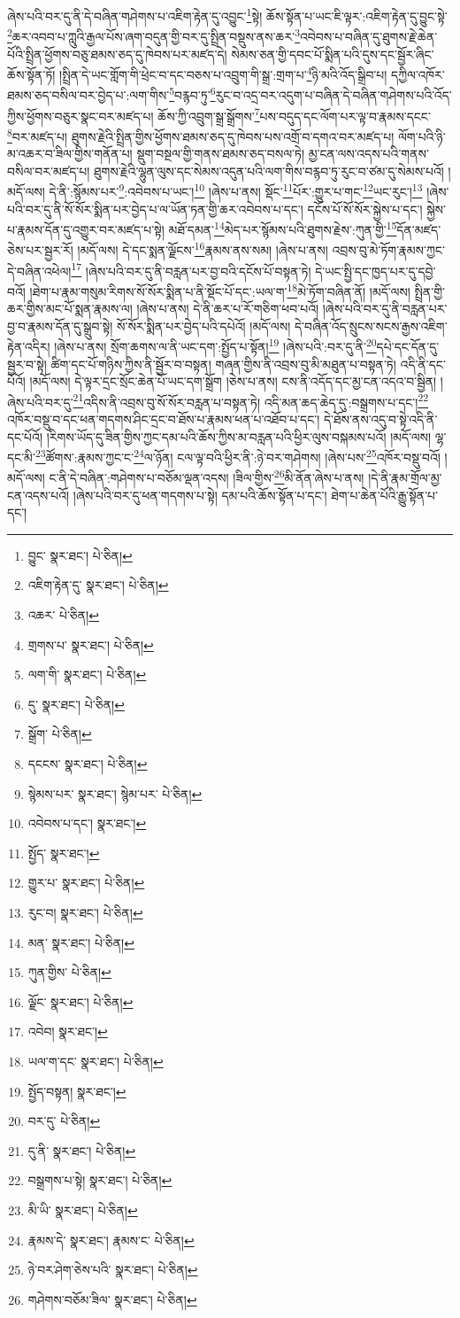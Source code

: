 ཞེས་པའི་བར་དུ་ནི་དེ་བཞིན་གཤེགས་པ་འཇིག་རྟེན་དུ་འབྱུང་\footnote{བྱུང་  སྣར་ཐང་།  པེ་ཅིན། }སྟེ། ཆོས་སྟོན་པ་ཡང་ཇི་ལྟར་:འཇིག་རྟེན་དུ་བྱུང་སྟེ་\footnote{འཇིག་རྟེན་དུ་  སྣར་ཐང་།  པེ་ཅིན། }ཆར་འབབ་པ་ཀླུའི་རྒྱལ་པོས་ཞག་བདུན་གྱི་བར་དུ་སྤྲིན་བསྡུས་ནས་ཆར་\footnote{འཆར་  པེ་ཅིན། }འབེབས་པ་བཞིན་དུ་ཐུགས་རྗེ་ཆེན་པོའི་སྤྲིན་ཕྱོགས་བཅུ་ཐམས་ཅད་དུ་ཁེབས་པར་མཛད་དེ། སེམས་ཅན་གྱི་དབང་པོ་སྨིན་པའི་དུས་དང་སྦྱོར་ཞིང་ཆོས་སྟོན་ཏོ། །སྤྲིན་དེ་ཡང་གློག་གི་ཕྲེང་བ་དང་བཅས་པ་འབྲུག་གི་སྒྲ་:གྲག་པ་\footnote{གྲགས་པ་  སྣར་ཐང་།  པེ་ཅིན། }ཉི་མའི་འོད་སྒྲིབ་པ། དཀྱིལ་འཁོར་ཐམས་ཅད་བསིལ་བར་བྱེད་པ་:ལག་གིས་\footnote{ལག་གི་  སྣར་ཐང་།  པེ་ཅིན། }བརྙབ་ཏུ་\footnote{དུ་  སྣར་ཐང་།  པེ་ཅིན། }རུང་བ་འདྲ་བར་འདུག་པ་བཞིན་དེ་བཞིན་གཤེགས་པའི་འོད་ཀྱིས་ཕྱོགས་བཅུར་སྣང་བར་མཛད་པ། ཆོས་ཀྱི་འབྲུག་སྒྲ་སྒྲོགས་\footnote{སྒྲོག་  པེ་ཅིན། }པས་བདུད་དང་ལོག་པར་ལྟ་བ་རྣམས་དངང་\footnote{དངངས་  སྣར་ཐང་།  པེ་ཅིན། }བར་མཛད་པ། ཐུགས་རྗེའི་སྤྲིན་གྱིས་ཕྱོགས་ཐམས་ཅད་དུ་ཁེབས་པས་འགྲོ་བ་དགའ་བར་མཛད་པ། ལོག་པའི་ཉི་མ་འཆར་བ་ཟིལ་གྱིས་གནོན་པ། སྡུག་བསྔལ་གྱི་གནས་ཐམས་ཅད་བསལ་ཏེ། མྱ་ངན་ལས་འདས་པའི་གནས་བསིལ་བར་མཛད་པ། ཐུགས་རྗེའི་ལྷུན་ལུས་དང་སེམས་འདུན་པའི་ལག་གིས་བརྙབ་ཏུ་རུང་བ་ཙམ་དུ་སེམས་པའོ། །མདོ་ལས། དེ་ནི་:སྙོམས་པར་\footnote{སྙེམས་པར་  སྣར་ཐང་། སྙེམ་པར་  པེ་ཅིན། }:འབེབས་པ་ཡང་།\footnote{འབེབས་པ་དང་།  སྣར་ཐང་། } །ཞེས་པ་ནས། སྡོང་\footnote{སྤྱོད་  སྣར་ཐང་། }པོར་:གྱུར་པ་གང་\footnote{གྱུར་པ་  སྣར་ཐང་།  པེ་ཅིན། }ཡང་རུང་།\footnote{རུང་བ།  སྣར་ཐང་།  པེ་ཅིན། } །ཞེས་པའི་བར་དུ་ནི་སོ་སོར་སྨིན་པར་བྱེད་པ་ལ་ཡོན་ཏན་གྱི་ཆར་འབེབས་པ་དང་། དངོས་པོ་སོ་སོར་སྐྱེས་པ་དང་། སྐྱེས་པ་རྣམས་དོན་དུ་འགྱུར་བར་མཛད་པ་སྟེ། མཐོ་དམན་\footnote{མན་  སྣར་ཐང་།  པེ་ཅིན། }མེད་པར་སྙོམས་པའི་ཐུགས་རྗེས་:ཀུན་གྱི་\footnote{ཀུན་གྱིས་  པེ་ཅིན། }དོན་མཛད་ཅེས་པར་སྦྱར་རོ། །མདོ་ལས། དེ་དང་སྨན་ལྗོངས་\footnote{ལྗོང་  སྣར་ཐང་།  པེ་ཅིན། }རྣམས་ནས་སམ། །ཞེས་པ་ནས། འབྲས་བུ་མེ་ཏོག་རྣམས་ཀྱང་དེ་བཞིན་འཕེལ།\footnote{འབེབ།  སྣར་ཐང་། } །ཞེས་པའི་བར་དུ་ནི་བརླན་པར་བྱ་བའི་དངོས་པོ་བསྟན་ཏེ། དེ་ཡང་སྤྱི་དང་ཁྱད་པར་དུ་དབྱེ་བའོ། །ཐེག་པ་རྣམ་གསུམ་རིགས་སོ་སོར་སྨིན་པ་ནི་སྡོང་པོ་དང་:ཡལ་ག་\footnote{ཡལ་ག་དང་  སྣར་ཐང་།  པེ་ཅིན། }མེ་ཏོག་བཞིན་ནོ། །མདོ་ལས། སྤྲིན་གྱི་ཆར་གྱིས་མང་པོ་སྨན་རྣམས་ལ། །ཞེས་པ་ནས། དེ་ནི་ཆར་པ་རོ་གཅིག་ཕབ་པའོ། །ཞེས་པའི་བར་དུ་ནི་བརླན་པར་བྱ་བ་རྣམས་དོན་དུ་སྒྲུབ་སྟེ། སོ་སོར་སྨིན་པར་བྱེད་པའི་དཔེའོ། །མདོ་ལས། དེ་བཞིན་འོད་སྲུངས་སངས་རྒྱས་འཇིག་རྟེན་འདིར། །ཞེས་པ་ནས། སྲོག་ཆགས་ལ་ནི་ཡང་དག་:སྤྱོད་པ་སྟོན།\footnote{སྤྱོད་བསྟན།  སྣར་ཐང་། } །ཞེས་པའི་:བར་དུ་ནི་\footnote{བར་དུ་  པེ་ཅིན། }དཔེ་དང་དོན་དུ་སྦྱར་བ་སྟེ། ཚིག་དང་པོ་གཉིས་ཀྱིས་ནི་སྦྱོར་བ་བསྟན། གཞན་གྱིས་ནི་འབྲས་བུ་མི་མཐུན་པ་བསྟན་ཏེ། འདི་ནི་དང་པོའོ། །མདོ་ལས། དེ་ལྟར་དྲང་སྲོང་ཆེན་པོ་ཡང་དག་སྒྲོག །ཅེས་པ་ནས། ངས་ནི་འདོད་དང་མྱ་ངན་འདའ་བ་སྦྱིན། །ཞེས་པའི་བར་དུ་\footnote{དུ་ནི་  སྣར་ཐང་།  པེ་ཅིན། }འདིས་ནི་འབྲས་བུ་སོ་སོར་བརླན་པ་བསྟན་ཏེ། འདི་མན་ཆད་ཆེད་དུ་:བསྒྲགས་པ་དང་།\footnote{བསྒྲགས་པ་སྟེ།  སྣར་ཐང་།  པེ་ཅིན། } འཁོར་བསྡུ་བ་དང་ཕན་གདགས་ཤིང་དྲང་བ་ཐོས་པ་རྣམས་ཕན་པ་འཐོབ་པ་དང་། དེ་ཐོས་ནས་འདུ་བ་སྟེ་འདི་ནི་དང་པོའོ། །རིགས་ཡོད་དུ་ཟིན་གྱིས་ཀྱང་དམ་པའི་ཆོས་ཀྱིས་མ་བརླན་པའི་ཕྱིར་ལུས་བསྐམས་པའོ། །མདོ་ལས། ལྷ་དང་མི་\footnote{མི་ཡི་  སྣར་ཐང་།  པེ་ཅིན། }ཚོགས་:རྣམས་ཀྱང་ང་\footnote{རྣམས་དེ་  སྣར་ཐང་། རྣམས་ང་  པེ་ཅིན། }ལ་ཉོན། ངལ་ལྟ་བའི་ཕྱིར་ནི་:ཉེ་བར་གཤེགས། །ཞེས་པས་\footnote{ཉེ་བར་ཤེག་ཅེས་པའི་  སྣར་ཐང་།  པེ་ཅིན། }འཁོར་བསྡུ་བའོ། །མདོ་ལས། ང་ནི་དེ་བཞིན་:གཤེགས་པ་བཅོམ་ལྡན་འདས། །ཟིལ་གྱིས་\footnote{གཤེགས་བཅོམ་ཟིལ་  སྣར་ཐང་།  པེ་ཅིན། }མི་ནོན་ཞེས་པ་ནས། །དེ་ནི་རྣམ་གྲོལ་མྱ་ངན་འདས་པའོ། །ཞེས་པའི་བར་དུ་ཕན་གདགས་པ་སྟེ། དམ་པའི་ཆོས་སྟོན་པ་དང་། ཐེག་པ་ཆེན་པོའི་རྒྱུ་སྟོན་པ་དང་། 